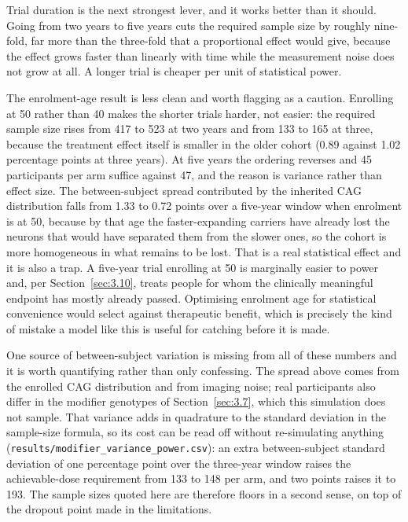 \documentclass[conference]{IEEEtran}
\begin{document}
Trial duration is the next strongest lever, and it works better than it should. Going from two years to five years cuts the required sample size by roughly nine-fold, far more than the three-fold that a proportional effect would give, because the effect grows faster than linearly with time while the measurement noise does not grow at all. A longer trial is cheaper per unit of statistical power.

The enrolment-age result is less clean and worth flagging as a caution. Enrolling at 50 rather than 40 makes the shorter trials harder, not easier: the required sample size rises from 417 to 523 at two years and from 133 to 165 at three, because the treatment effect itself is smaller in the older cohort (0.89 against 1.02 percentage points at three years). At five years the ordering reverses and 45 participants per arm suffice against 47, and the reason is variance rather than effect size. The between-subject spread contributed by the inherited CAG distribution falls from 1.33 to 0.72 points over a five-year window when enrolment is at 50, because by that age the faster-expanding carriers have already lost the neurons that would have separated them from the slower ones, so the cohort is more homogeneous in what remains to be lost. That is a real statistical effect and it is also a trap. A five-year trial enrolling at 50 is marginally easier to power and, per Section~\ref{sec:3.10}, treats people for whom the clinically meaningful endpoint has mostly already passed. Optimising enrolment age for statistical convenience would select against therapeutic benefit, which is precisely the kind of mistake a model like this is useful for catching before it is made.

One source of between-subject variation is missing from all of these numbers and it is worth quantifying rather than only confessing. The spread above comes from the enrolled CAG distribution and from imaging noise; real participants also differ in the modifier genotypes of Section~\ref{sec:3.7}, which this simulation does not sample. That variance adds in quadrature to the standard deviation in the sample-size formula, so its cost can be read off without re-simulating anything (\texttt{results/\allowbreak{}modifier\_\allowbreak{}variance\_\allowbreak{}power.\allowbreak{}csv}): an extra between-subject standard deviation of one percentage point over the three-year window raises the achievable-dose requirement from 133 to 148 per arm, and two points raises it to 193. The sample sizes quoted here are therefore floors in a second sense, on top of the dropout point made in the limitations.
\end{document}
